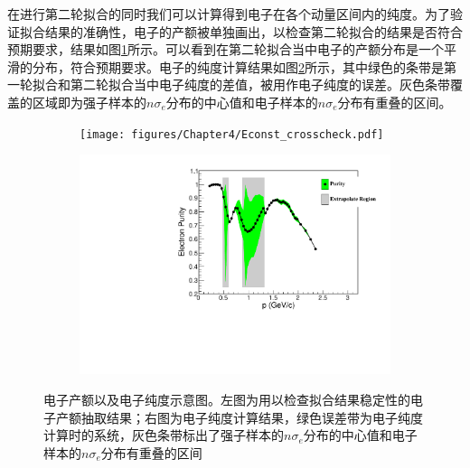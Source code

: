 在进行第二轮拟合的同时我们可以计算得到电子在各个动量区间内的纯度。为了验证拟合结果的准确性，电子的产额被单独画出，以检查第二轮拟合的结果是否符合预期要求，结果如图\ref{fig:Econst_crosscheck}所示。可以看到在第二轮拟合当中电子的产额分布是一个平滑的分布，符合预期要求。电子的纯度计算结果如图\ref{fig:nSigEcut4TpcE_Pur}所示，其中绿色的条带是第一轮拟合和第二轮拟合当中电子纯度的差值，被用作电子纯度的误差。灰色条带覆盖的区域即为强子样本的$n\sigma_{e}$分布的中心值和电子样本的$n\sigma_{e}$分布有重叠的区间。
\begin{figure}[h!]
    \centering
    \begin{subfigure}[h!]{0.43\textwidth}
            \texttt{[image: figures/Chapter4/Econst\_crosscheck.pdf]}
            \caption{}
            \label{fig:Econst_crosscheck}
    \end{subfigure}
    \begin{subfigure}[h!]{0.43\textwidth}
            \includegraphics[width=\textwidth]{figures/Chapter4/nSigEcut4TpcE_Pur.pdf}
            \caption{}
            \label{fig:nSigEcut4TpcE_Pur}
    \end{subfigure}
    \caption[电子产额以及电子纯度示意图]{电子产额以及电子纯度示意图。左图为用以检查拟合结果稳定性的电子产额抽取结果；右图为电子纯度计算结果，绿色误差带为电子纯度计算时的系统，灰色条带标出了强子样本的$n\sigma_{e}$分布的中心值和电子样本的$n\sigma_{e}$分布有重叠的区间}
    \label{fig:Purity_check}
\end{figure}